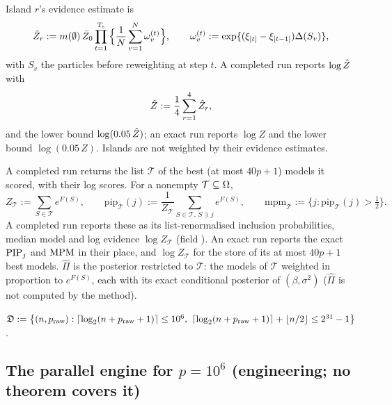 \begin{definition}\label{def:zhat}
Island $r$'s evidence estimate is
\[
  \hat Z_r:=m(\emptyset)\,\bar Z_0\prod_{t=1}^{T_{\mathrm s}}\Big\{\frac1N\sum_{v=1}^N\omega^{(t)}_v\Big\},\qquad
  \omega^{(t)}_v:=\exp\{(\xi_{[t]}-\xi_{[t-1]})\Delta(S_v)\},
\]
with $S_v$ the particles before reweighting at step $t$. A completed run reports $\log\hat Z$ with
\begin{equation}\label{eq:pool}
  \hat Z:=\frac14\sum_{r=1}^4\hat Z_r,
\end{equation}
and the lower bound $\log(0.05\,\hat Z)$; an exact run reports $\log Z$ and the lower bound $\log(0.05\,Z)$. Islands are not weighted by their evidence
estimates.
\end{definition}

\begin{definition}\label{def:list}
A completed run returns the list $\mathcal T$ of the best (at most $40p+1$) models it scored, with their log scores. For a
nonempty $\mathcal T\subseteq\Omega$,
\[
  Z_{\mathcal T}:=\sum_{S\in\mathcal T}e^{F(S)},\qquad
  \mathrm{pip}_{\mathcal T}(j):=\frac{1}{Z_{\mathcal T}}\sum_{S\in\mathcal T,\,S\ni j}e^{F(S)},\qquad
  \mathrm{mpm}_{\mathcal T}:=\{j:\mathrm{pip}_{\mathcal T}(j)>\tfrac12\}.
\]
A completed run reports these as its list-renormalised inclusion probabilities, median model and log evidence $\log Z_{\mathcal T}$ (field ).
An exact run reports the exact $\mathrm{PIP}_j$ and $\mathrm{MPM}$ in their place, and $\log Z_{\mathcal T}$ for the store of its at most $40p+1$ best models. $\hat\Pi$ is
the posterior restricted to $\mathcal T$: the models of $\mathcal T$ weighted in proportion to $e^{F(S)}$, each with its
exact conditional posterior of $(\beta,\sigma^2)$ ($\hat\Pi$ is not computed by the method).
\end{definition}

\begin{definition}\label{def:dom}
$\Dom:=\big\{(n,\praw):\lceil\log_2(n+\praw+1)\rceil\le10^6,\ \lceil\log_2(n+\praw+1)\rceil+\lfloor n/2\rfloor\le2^{31}-1\big\}$.
\end{definition}

\subsection{The parallel engine for \texorpdfstring{$p=10^6$}{p=10\^{}6} (engineering; no theorem covers it)}\label{sec:supp-1m}

